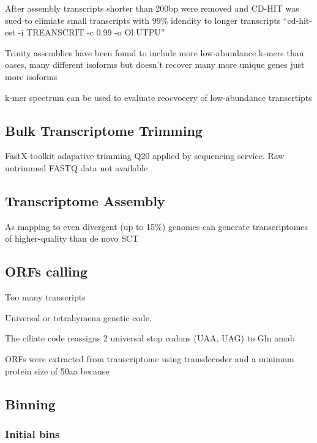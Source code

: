 After assembly transcripts shorter than 200bp were removed and CD-HIT was sued to elimiate small 
transcripts with 99\% idendity to longer transcripts  ``cd-hit-est -i TREANSCRIT -c 0.99 -o Ol:UTPU''


Trinity assemblies have been found to include more low-abundance k-mers than oases, many different isoforms
but doesn't recover many more unique genes just more isoforms \citep{Lowe2014} 

k-mer spectrum can be used to evaluate reocvoeery of low-abundance transcrtipts \citep{Pop2009}






\subsection{Bulk Transcriptome Trimming}

FastX-toolkit adapative trimming Q20 applied by sequencing service.
Raw untrimmed FASTQ data not available


\subsection{Transcriptome Assembly}

As mapping to even divergent (up to 15\%) genomes can generate transcriptomes of higher-quality
than de novo \citep{Vijay2013}
SCT



\subsection{ORFs calling}

Too many transcripts 

Universal or tetrahymena genetic code.

The ciliate code reassigns 2 universal stop codons (UAA, UAG) to Gln amab



ORFs were extracted from transcriptome using transdecoder and a minimum protein size of 50aa
because


\subsection{Binning}


\subsubsection{Initial bins}

